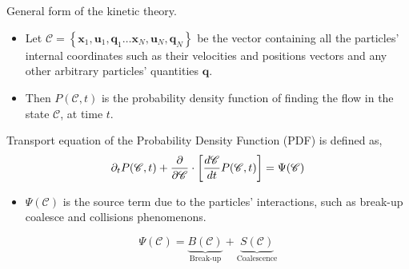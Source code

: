 \documentclass{sintefbeamer}
\begin{document}
\section*{}

\begin{frame}{General form of the kinetic theory.}
  \begin{definition}
    \begin{itemize}
      \item Let $\mathscr{C} =\left\{\textbf{x}_1,\textbf{u}_1, \textbf{q}_1\ldots\textbf{x}_N,\textbf{u}_N, \textbf{q}_N\right\}$ be the vector containing all the particles' internal coordinates such as their velocities and positions vectors and any other arbitrary particles' quantities $\textbf{q}$. 
      \item Then $P(\mathscr{C},t)$ is the probability density function of finding the flow in the state $\mathscr{C}$, at time $t$. 
    \end{itemize}
  \end{definition}
  Transport equation of the Probability Density Function (PDF) is defined as,
  \begin{equation}
    \partial_t P(\mathscr{C},t)
    + \frac{\partial}{\partial \mathscr{C}} \cdot
    \left[
        \frac{d\mathscr{C}}{dt}  
        P(\mathscr{C},t)
    \right]
    = \Psi(\mathscr{C})
    \label{eq:dt_P}
\end{equation}

  \begin{itemize}
    \item $\Psi(\mathscr{C})$ is the source term due to the particles' interactions, such as break-up coalesce and collisions phenomenons. 
  \end{itemize}
  \begin{equation*}
    \Psi(\mathscr{C}) =
    \underbrace{B(\mathscr{C})}_{\text{Break-up}}
    +\underbrace{S(\mathscr{C})}_{\text{Coalescence}}
  \end{equation*}
\end{frame}
\end{document}

